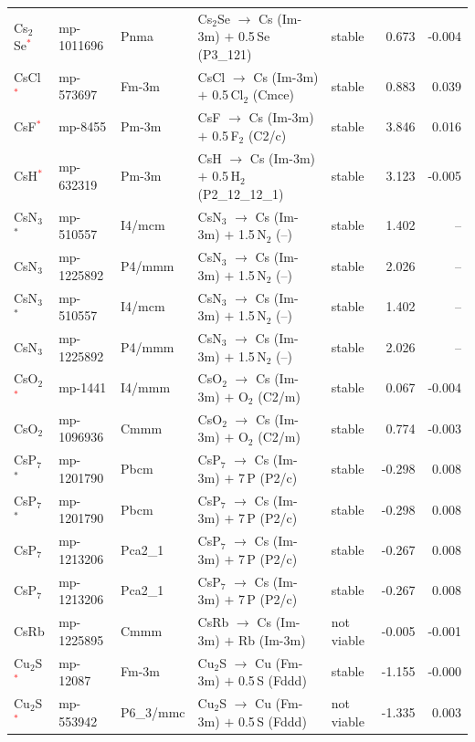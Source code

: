 \begin{longtable}{@{}ll l@{\hspace{4pt}} p{4.6cm} l@{\hspace{4pt}} rr@{}}
Cs$_{2}$Se\textcolor{red}{$^*$} & mp-1011696 & Pnma & Cs$_{2}$Se $\to$ Cs (Im-3m) $+$ 0.5\,Se (P3\_121) & stable & 0.673 & -0.004 \\
CsCl\textcolor{red}{$^*$} & mp-573697 & Fm-3m & CsCl $\to$ Cs (Im-3m) $+$ 0.5\,Cl$_{2}$ (Cmce) & stable & 0.883 & 0.039 \\
CsF\textcolor{red}{$^*$} & mp-8455 & Pm-3m & CsF $\to$ Cs (Im-3m) $+$ 0.5\,F$_{2}$ (C2/c) & stable & 3.846 & 0.016 \\
CsH\textcolor{red}{$^*$} & mp-632319 & Pm-3m & CsH $\to$ Cs (Im-3m) $+$ 0.5\,H$_{2}$ (P2\_12\_12\_1) & stable & 3.123 & -0.005 \\
CsN$_{3}$$^*$ & mp-510557 & I4/mcm & CsN$_{3}$ $\to$ Cs (Im-3m) $+$ 1.5\,N$_{2}$ (--) & stable & 1.402 & -- \\
CsN$_{3}$ & mp-1225892 & P4/mmm & CsN$_{3}$ $\to$ Cs (Im-3m) $+$ 1.5\,N$_{2}$ (--) & stable & 2.026 & -- \\
CsN$_{3}$$^*$ & mp-510557 & I4/mcm & CsN$_{3}$ $\to$ Cs (Im-3m) $+$ 1.5\,N$_{2}$ (--) & stable & 1.402 & -- \\
CsN$_{3}$ & mp-1225892 & P4/mmm & CsN$_{3}$ $\to$ Cs (Im-3m) $+$ 1.5\,N$_{2}$ (--) & stable & 2.026 & -- \\
CsO$_{2}$\textcolor{red}{$^*$} & mp-1441 & I4/mmm & CsO$_{2}$ $\to$ Cs (Im-3m) $+$ O$_{2}$ (C2/m) & stable & 0.067 & -0.004 \\
CsO$_{2}$ & mp-1096936 & Cmmm & CsO$_{2}$ $\to$ Cs (Im-3m) $+$ O$_{2}$ (C2/m) & stable & 0.774 & -0.003 \\
CsP$_{7}$$^*$ & mp-1201790 & Pbcm & CsP$_{7}$ $\to$ Cs (Im-3m) $+$ 7\,P (P2/c) & stable & -0.298 & 0.008 \\
CsP$_{7}$$^*$ & mp-1201790 & Pbcm & CsP$_{7}$ $\to$ Cs (Im-3m) $+$ 7\,P (P2/c) & stable & -0.298 & 0.008 \\
CsP$_{7}$ & mp-1213206 & Pca2\_1 & CsP$_{7}$ $\to$ Cs (Im-3m) $+$ 7\,P (P2/c) & stable & -0.267 & 0.008 \\
CsP$_{7}$ & mp-1213206 & Pca2\_1 & CsP$_{7}$ $\to$ Cs (Im-3m) $+$ 7\,P (P2/c) & stable & -0.267 & 0.008 \\
CsRb & mp-1225895 & Cmmm & CsRb $\to$ Cs (Im-3m) $+$ Rb (Im-3m) & not viable & -0.005 & -0.001 \\
Cu$_{2}$S\textcolor{red}{$^*$} & mp-12087 & Fm-3m & Cu$_{2}$S $\to$ Cu (Fm-3m) $+$ 0.5\,S (Fddd) & stable & -1.155 & -0.000 \\
Cu$_{2}$S\textcolor{red}{$^*$} & mp-553942 & P6\_3/mmc & Cu$_{2}$S $\to$ Cu (Fm-3m) $+$ 0.5\,S (Fddd) & not viable & -1.335 & 0.003 \\

\end{longtable}
